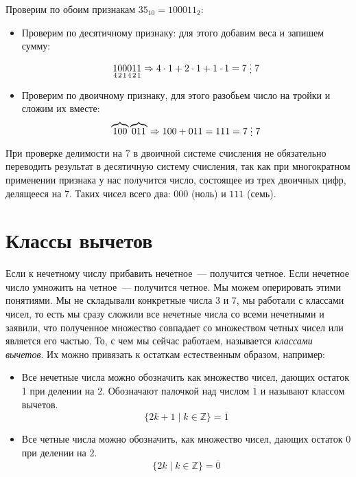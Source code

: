 \documentclass[russian]{lecture-notes}
\newcommand{\divs}{\mathrel{\raisebox{-2pt}{\vdots}}}
\newcommand{\klas}[1]{\overline{#1}}
\begin{document}
\begin{problem}
	\begin{example}
		Проверим по обоим признакам $35_{10}=100011_2$:
		\begin{itemize}
			\item Проверим по десятичному признаку: для этого добавим веса и запишем сумму:
			\[\underset{4}{1}\underset{2}{0}\underset{1}{0}\underset{4}{0}\underset{2}{1}\underset{1}{1} \Rightarrow 4\cdot1+2\cdot1+1\cdot1=7 \divs 7\]
			\item Проверим по двоичному признаку, для этого разобьем число на тройки и сложим их вместе:
			\[\overbrace{100}\overbrace{011} \Rightarrow 100+011=111=7 \divs 7\]
		\end{itemize}
	\end{example}
\end{problem}

\begin{note}
	При проверке делимости на $7$ в двоичной системе счисления не обязательно переводить результат в десятичную систему счисления, так как при многократном применении признака у нас получится число, состоящее из трех двоичных цифр, делящееся на $7$. Таких чисел всего два: $000$ (ноль) и $111$ (семь).
\end{note}

\section{Классы вычетов}

\begin{example}
	Если к нечетному числу прибавить нечетное~--- получится четное. Если нечетное число умножить на четное~--- получится четное. Мы можем оперировать этими понятиями. Мы не складывали конкретные числа $3$ и $7$, мы работали с  классами чисел, то есть мы сразу сложили все нечетные числа со всеми нечетными и заявили, что  полученное множество совпадает со множеством четных чисел или является его частью. То, с чем мы сейчас работаем, называется \emph{классами вычетов}. Их можно привязать к остаткам естественным образом, например:
	\begin{itemize}
		\item\label{exp:chet}Все нечетные числа можно обозначить как множество чисел, дающих остаток 1 при делении на 2. Обозначают палочкой над числом $\klas{1}$ и называют классом вычетов.
		\[ \{ 2k+1 \mid k \in \mathbb{Z}\} = \klas{1} \]
		\item\label{exp:nechet}Все четные числа можно обозначить, как множество чисел, дающих остаток 0 при делении на 2.
		\[ \{ 2k \mid k \in \mathbb{Z}\} = \klas{0}\]
	\end{itemize}
\end{example}
\end{document}
